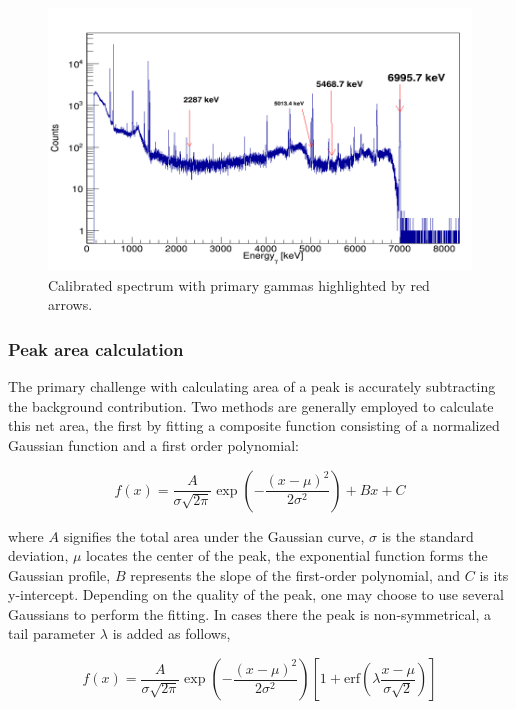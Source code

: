 \documentclass[a4paper,12pt]{article}
\begin{document}
\begin{figure}
    \centering
    \hspace*{-1.5cm}
    \includegraphics[width=16cm]{calib_spec.png}
    \caption{Calibrated spectrum with primary gammas highlighted by red arrows.}
    \label{fig:calib_spec}
\end{figure}



\subsubsection{Peak area calculation}\label{area}

 The primary challenge with calculating area of a peak is accurately subtracting the background contribution.  Two methods are generally employed to calculate this net area, the first by fitting a composite function consisting of a normalized Gaussian function and a first order polynomial: 

\begin{equation}
f(x) = \frac{A}{\sigma\sqrt{2\pi}} \exp\left(-\frac{(x-\mu)^2}{2\sigma^2}\right) + Bx + C
\end{equation}

where \( A \) signifies the total area under the Gaussian curve, \( \sigma \) is the standard deviation, \( \mu \) locates the center of the peak, the exponential function forms the Gaussian profile, \( B \) represents the slope of the first-order polynomial, and \( C \) is its y-intercept.  Depending on the quality of the peak, one may choose to use several Gaussians to perform the fitting.  In cases there the peak is non-symmetrical, a tail parameter $\lambda$ is added as follows, 

\begin{equation}
f(x) = \frac{A}{\sigma\sqrt{2\pi}} \exp\left(-\frac{(x-\mu)^2}{2\sigma^2}\right) \left[1 + \text{erf}\left(\lambda\frac{x-\mu}{\sigma\sqrt{2}}\right)\right]
\end{equation}
\end{document}
